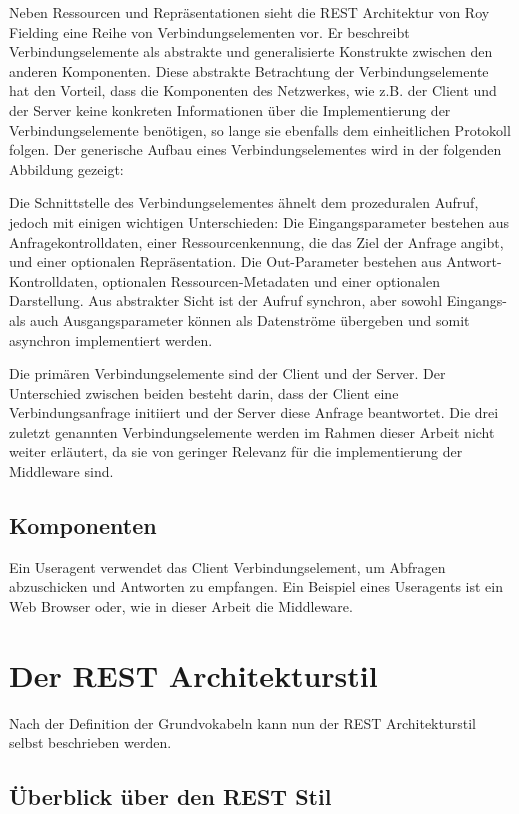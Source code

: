 Neben Ressourcen und Repräsentationen sieht die REST Architektur von Roy Fielding eine Reihe von Verbindungselementen vor. Er beschreibt Verbindungselemente als abstrakte und generalisierte Konstrukte zwischen den anderen Komponenten. Diese abstrakte Betrachtung der Verbindungselemente hat den Vorteil, dass die Komponenten des Netzwerkes, wie z.B. der Client und der Server keine konkreten Informationen über die Implementierung der Verbindungselemente benötigen, so lange sie ebenfalls dem einheitlichen Protokoll folgen. Der generische Aufbau eines Verbindungselementes wird in der folgenden Abbildung gezeigt:

Die Schnittstelle des Verbindungselementes ähnelt dem prozeduralen Aufruf, jedoch mit einigen wichtigen Unterschieden: Die Eingangsparameter bestehen aus Anfragekontrolldaten, einer Ressourcenkennung, die das Ziel der Anfrage angibt, und einer optionalen Repräsentation. Die Out-Parameter bestehen aus Antwort-Kontrolldaten, optionalen Ressourcen-Metadaten und einer optionalen Darstellung. Aus abstrakter Sicht ist der Aufruf synchron, aber sowohl Eingangs- als auch Ausgangsparameter können als Datenströme übergeben und somit asynchron implementiert werden.

Die primären Verbindungselemente sind der Client und der Server. Der Unterschied zwischen beiden besteht darin, dass der Client eine Verbindungsanfrage initiiert und der Server diese Anfrage beantwortet. Die drei zuletzt genannten Verbindungselemente werden im Rahmen dieser Arbeit nicht weiter erläutert, da sie von geringer Relevanz für die implementierung der Middleware sind.

\subsection{Komponenten}

Ein Useragent verwendet das Client Verbindungselement, um Abfragen abzuschicken und Antworten zu empfangen. Ein Beispiel eines Useragents ist ein Web Browser oder, wie in dieser Arbeit die Middleware.

\section{Der REST Architekturstil}

Nach der Definition der Grundvokabeln kann nun der REST Architekturstil selbst beschrieben werden.

\subsection{Überblick über den REST Stil}

